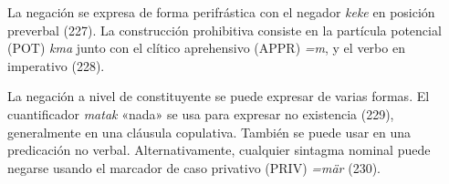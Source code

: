 La negación se expresa de forma perifrástica con el negador {\setmainfont{Charis SIL} \textit{keke}} en posición preverbal \textcolor{MidnightBlue}{\citep{komzo}} (227). La construcción prohibitiva consiste en la partícula potencial (POT) {\setmainfont{Charis SIL} \textit{kma}} junto con el clítico aprehensivo (APPR) {\setmainfont{Charis SIL} \textit{=m}}, y el verbo en imperativo (228). 

La negación a nivel de constituyente se puede expresar de varias formas. El cuantificador {\setmainfont{Charis SIL} \textit{matak}} «nada» se usa para expresar no existencia (229), generalmente en una cláusula copulativa. También se puede usar en una predicación no verbal. Alternativamente, cualquier sintagma nominal puede negarse usando el marcador de caso privativo (PRIV){\setmainfont{Charis SIL} \textit{=mär}} (230).